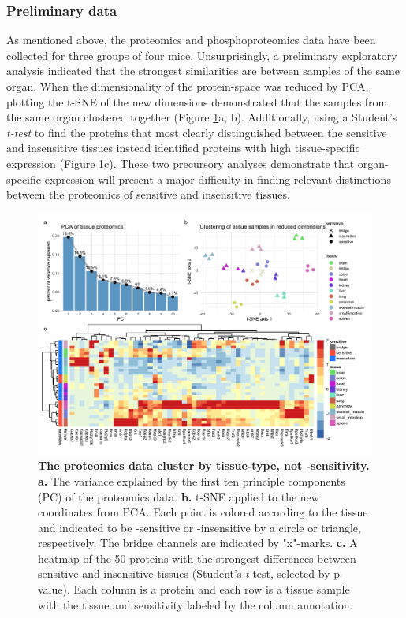 
\subsubsection*{Preliminary data}

As mentioned above, the proteomics and phosphoproteomics data have been collected for three groups of four mice.
Unsurprisingly, a preliminary exploratory analysis indicated that the strongest similarities are between samples of the same organ.
When the dimensionality of the protein-space was reduced by PCA, plotting the t-SNE of the new dimensions demonstrated that the samples from the same organ clustered together (Figure \ref{fig:proteomics-eda}a, b).
Additionally, using a Student's \emph{t-test} to find the proteins that most clearly distinguished between the sensitive and insensitive tissues instead identified proteins with high tissue-specific expression (Figure \ref{fig:proteomics-eda}c).
These two precursory analyses demonstrate that organ-specific expression will present a major difficulty in finding relevant distinctions between the proteomics of sensitive and insensitive tissues.

\begin{figure}[ht]
\centering
\includegraphics[width=180mm]{figures/aim2/proteomics-eda_figure.jpeg}
\caption{
    \textbf{The proteomics data cluster by tissue-type, not \KRAS{}-sensitivity.}
    \textbf{a.} The variance explained by the first ten principle components (PC) of the proteomics data.
    \textbf{b.} t-SNE applied to the new coordinates from PCA. Each point is colored according to the tissue and indicated to be \KRAS{}-sensitive or -insensitive by a circle or triangle, respectively. The bridge channels are indicated by "x"-marks.
    \textbf{c.} A heatmap of the 50 proteins with the strongest differences between sensitive and insensitive tissues (Student's \emph{t}-test, selected by p-value). Each column is a protein and each row is a tissue sample with the tissue and \KRAS{} sensitivity labeled by the column annotation.
}
\label{fig:proteomics-eda}
\end{figure}



